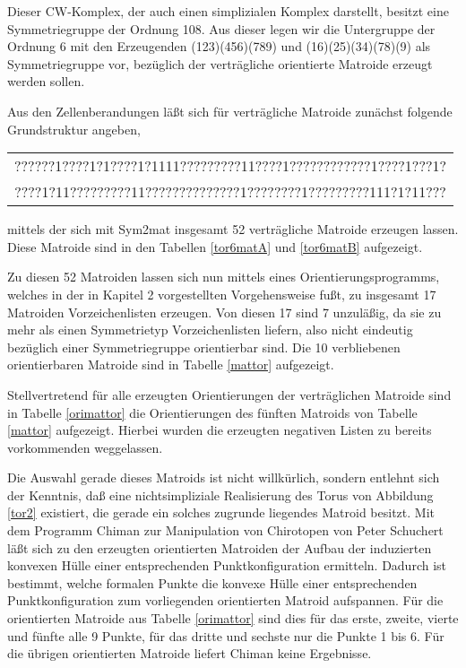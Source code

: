 Dieser CW-Komplex, der auch einen simplizialen Komplex darstellt, besitzt
eine Symmetriegruppe der Ordnung 108. Aus dieser legen wir die Untergruppe der
Ordnung 6 mit den Erzeugenden (123)(456)(789) und (16)(25)(34)(78)(9) als
Symmetriegruppe vor, bezüglich der verträgliche orientierte Matroide erzeugt
werden sollen.

Aus den Zellenberandungen läßt sich für verträgliche Matroide zunächst
folgende Grundstruktur angeben,

\begin{center}
{\footnotesize\tt\begin{tabular}{c}
??????1????1?1????1?1111?????????11????1????????????1????1???1?\\
????1?11?????????11??????????????1????????1?????????111?1?11???
\end{tabular}}
\end{center}

mittels der sich mit {\sc Sym2mat} insgesamt 52 verträgliche Matroide
erzeugen lassen. Diese Matroide sind in den Tabellen \ref{tor6matA}
und \ref{tor6matB} aufgezeigt.

Zu diesen 52 Matroiden lassen sich nun mittels eines Orientierungsprogramms,
welches in der in Kapitel 2 vorgestellten Vorgehensweise fußt, zu insgesamt
17 Matroiden Vorzeichenlisten erzeugen. Von diesen 17 sind 7 unzuläßig,
da sie zu mehr als einen Symmetrietyp Vorzeichenlisten liefern, also nicht
eindeutig bezüglich einer Symmetriegruppe orientierbar sind.
Die 10 verbliebenen orientierbaren Matroide sind in Tabelle \ref{mattor}
aufgezeigt.

Stellvertretend für alle erzeugten Orientierungen der verträglichen Matroide
sind in Tabelle \ref{orimattor} die Orientierungen des fünften Matroids
von Tabelle \ref{mattor} aufgezeigt. Hierbei wurden die erzeugten negativen
Listen zu bereits vorkommenden weggelassen.

Die Auswahl gerade dieses Matroids ist nicht willkürlich, sondern entlehnt
sich der Kenntnis, daß eine nichtsimpliziale Realisierung des Torus von
Abbildung \ref{tor2} existiert, die gerade ein solches zugrunde liegendes
Matroid besitzt. Mit dem Programm {\sc Chiman} zur Manipulation von Chirotopen
von Peter Schuchert läßt sich zu den erzeugten orientierten Matroiden der
Aufbau der induzierten konvexen Hülle einer entsprechenden Punktkonfiguration
ermitteln. Dadurch ist bestimmt, welche formalen Punkte die konvexe Hülle einer
entsprechenden Punktkonfiguration zum vorliegenden orientierten Matroid
aufspannen. Für die orientierten Matroide aus Tabelle \ref{orimattor} sind
dies für das erste, zweite, vierte und fünfte alle 9 Punkte, für das dritte
und sechste nur die Punkte 1 bis 6. Für die übrigen orientierten Matroide
liefert {\sc Chiman} keine Ergebnisse.

